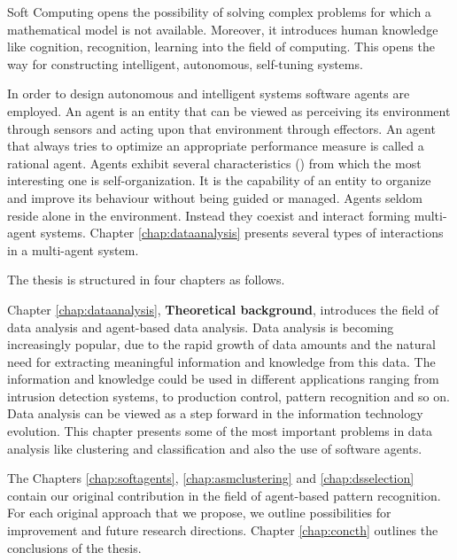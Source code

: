 Soft Computing opens the  possibility of solving complex problems for which a mathematical model is not available. Moreover, it introduces human knowledge like cognition, recognition, learning into the field of computing. This opens the way for constructing intelligent, autonomous, self-tuning systems. 

In order to design autonomous and intelligent systems software agents are employed. An agent is an entity that can be viewed as perceiving its environment through sensors and acting upon that environment through effectors. An agent that always tries to optimize an appropriate performance measure is called a rational agent. 
Agents exhibit several characteristics (\cite{Serban04Tehnici, Serban06Sisteme}) from which the most interesting one is self-organization. It is the capability of an entity to organize and improve its behaviour without being guided or managed.
Agents seldom reside alone in the environment. Instead they coexist and interact forming multi-agent systems. Chapter \ref{chap:dataanalysis} presents several types of interactions in a multi-agent system. 

The thesis is structured in four chapters as follows.

Chapter \ref{chap:dataanalysis}, \textbf{Theoretical background}, introduces the field of data analysis and agent-based data analysis. Data analysis is becoming increasingly popular, due to the rapid growth of data amounts and the natural need for extracting meaningful information and knowledge from this data. The information and knowledge could be used in different applications ranging from intrusion detection systems, to production control, pattern recognition and so on. Data analysis can be viewed as a step forward in the information technology evolution. This chapter presents some of the most important problems in data analysis like clustering and classification and also the use of software agents. 

The Chapters \ref{chap:softagents}, \ref{chap:asmclustering} and \ref{chap:dsselection} contain our original contribution in the field of agent-based pattern recognition.  For each original approach that we propose, we outline possibilities for improvement and future research directions. Chapter \ref{chap:concth} outlines the conclusions of the thesis.

